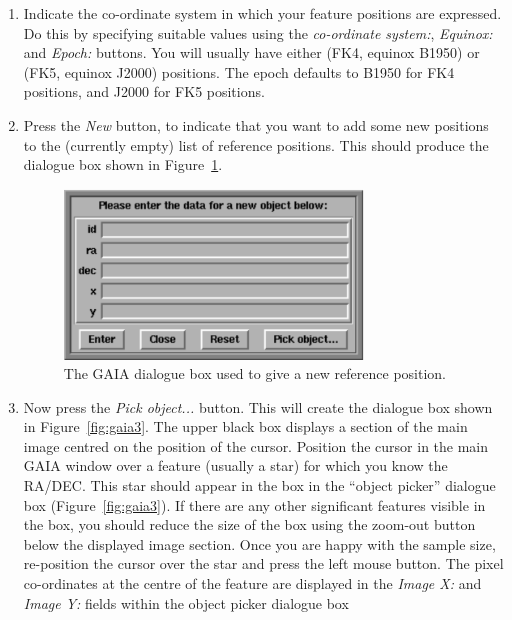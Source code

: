 \documentclass[twoside,11pt]{starlink}
\begin{document}
\begin{enumerate}
\item Indicate the co-ordinate system in which your feature positions are
expressed. Do this by specifying suitable values using the \emph{co-ordinate
system:}, \emph{Equinox:} and \emph{Epoch:} buttons. You will usually have
either (FK4, equinox B1950) or (FK5, equinox J2000) positions. The epoch
defaults to B1950 for FK4 positions, and J2000 for FK5 positions.

\item Press the \emph{New} button, to indicate that you want to add some
new positions to the (currently empty) list of reference positions. This
should produce the dialogue box shown in
Figure~\ref{fig:gaia2}.

  \begin{figure}[htb]
  \begin{center}
  \includegraphics[clip,width=0.75\textwidth]{sun223_figures/gaia2}
  \caption{The GAIA dialogue box used to give a new reference position.}
  \label{fig:gaia2}
  \end{center}
  \end{figure}

\item Now press the \emph{Pick object...} button. This will create the
dialogue box shown in Figure~\ref{fig:gaia3}.
The upper black box displays a section of the main image centred on the position
of the cursor. Position the cursor in the main GAIA window over a feature
(usually a star) for which you know the RA/DEC. This star should appear
in the box in the ``object picker'' dialogue box (Figure~\ref{fig:gaia3}).
If there are any other significant features visible in the box, you should
reduce the size of the box using the zoom-out button below the displayed
image section. Once you are happy with the
sample size, re-position the cursor over the star and press the left
mouse button. The pixel co-ordinates at the centre of the feature are
displayed in the \emph{Image X:} and \emph{Image Y:} fields within the
object picker dialogue box


\end{enumerate}
\end{document}
